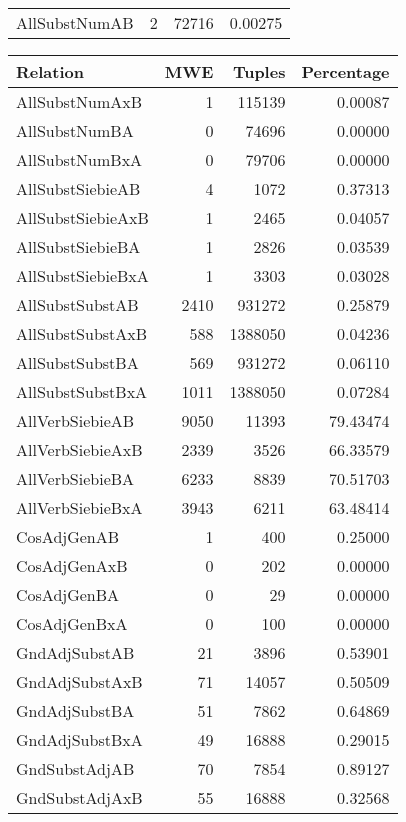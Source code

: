 \begin{table}[t]
\begin{tabular}{|l|r|r|r|}
        AllSubstNumAB & 2 & 72716 & 0.00275 \\
        \end{tabular}
        \quad
        \begin{tabular}{|l|r|r| r|}
        \hline 
        \textbf{Relation} & \textbf{MWE} & \textbf{Tuples} & \textbf{Percentage} \\
        \hline
        AllSubstNumAxB & 1 & 115139 & 0.00087 \\
        AllSubstNumBA & 0 & 74696 & 0.00000 \\
        AllSubstNumBxA & 0 & 79706 & 0.00000 \\
        AllSubstSiebieAB & 4 & 1072 & 0.37313 \\
        AllSubstSiebieAxB & 1 & 2465 & 0.04057 \\
        AllSubstSiebieBA & 1 & 2826 & 0.03539 \\
        AllSubstSiebieBxA & 1 & 3303 & 0.03028 \\
        AllSubstSubstAB & 2410 & 931272 & 0.25879 \\
        AllSubstSubstAxB & 588 & 1388050 & 0.04236 \\
        AllSubstSubstBA & 569 & 931272 & 0.06110 \\
        AllSubstSubstBxA & 1011 & 1388050 & 0.07284 \\
        AllVerbSiebieAB & 9050 & 11393 & 79.43474 \\
        AllVerbSiebieAxB & 2339 & 3526 & 66.33579 \\
        AllVerbSiebieBA & 6233 & 8839 & 70.51703 \\
        AllVerbSiebieBxA & 3943 & 6211 & 63.48414 \\
        CosAdjGenAB & 1 & 400 & 0.25000 \\
        CosAdjGenAxB & 0 & 202 & 0.00000 \\
        CosAdjGenBA & 0 & 29 & 0.00000 \\
        CosAdjGenBxA & 0 & 100 & 0.00000 \\
        GndAdjSubstAB & 21 & 3896 & 0.53901 \\
        GndAdjSubstAxB & 71 & 14057 & 0.50509 \\
        GndAdjSubstBA & 51 & 7862 & 0.64869 \\
        GndAdjSubstBxA & 49 & 16888 & 0.29015 \\
        GndSubstAdjAB & 70 & 7854 & 0.89127 \\
        GndSubstAdjAxB & 55 & 16888 & 0.32568 \\

\end{tabular}
\end{table}

